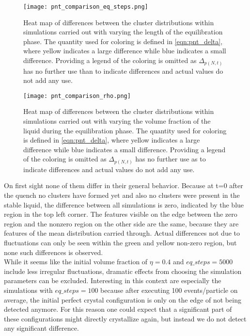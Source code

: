 \begin{figure}[h!]
\centering
\texttt{[image: pnt\_comparison\_eq\_steps.png]}
\caption[Heat maps of differences under variation of equilibration step number]{Heat map of differences between the cluster distributions within simulations carried out with varying the length of the equilibration phase. The quantity used for coloring is defined in \autoref{eqn:pnt_delta}, where yellow indicates a large difference while blue indicates a small difference. Providing a legend of the coloring is omitted as $\Delta_{p(N,t)}$ has no further use than to indicate differences and actual values do not add any use.}
\label{fig:pnt_eq_step_comparison}
\end{figure}


\begin{figure}[h!]
\centering
\texttt{[image: pnt\_comparison\_rho.png]}
\caption[Heat maps of differences under variation of initial density]{Heat map of differences between the cluster distributions within simulations carried out with varying the volume fraction of the liquid during the equilibration phase. The quantity used for coloring is defined in \autoref{eqn:pnt_delta}, where yellow indicates a large difference while blue indicates a small difference. Providing a legend of the coloring is omitted as $\Delta_{p(N,t)}$ has no further use as to indicate differences and actual values do not add any use.}
\label{fig:pnt_rho_comparison}
\end{figure}

On first sight none of them differ in their general behavior. Because at t=0 after the quench no clusters have formed yet and also no clusters were present in the stable liquid, the difference between all simulations is zero, indicated by the blue region in the top left corner. The features visible on the edge between the zero region and the nonzero region on the other side are the same, because they are features of the mean distribution carried through. Actual differences not due to fluctuations can only be seen within the green and yellow non-zero region, but none such differences is observed.\\

While it seems like the initial volume fraction of $\eta=0.4$ and $eq\_steps = 5000$ include less irregular fluctuations, dramatic effects from choosing the simulation parameters can be excluded. Interesting in this context are especially the simulations with $eq\_steps = 100$ because after executing 100 events/particle on average, the initial perfect crystal configuration is only on the edge of not being detected anymore. For this reason one could expect that a significant part of these configurations might directly crystallize again, but instead we do not detect any significant difference.\\

